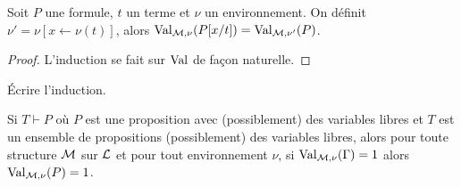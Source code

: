 \begin{lem}
    Soit $P$ une formule, $t$ un terme et $\nu$ un environnement. On définit $\nu' = \nu[x \leftarrow \nu(t)]$, alors $\mathrm{Val}_{\mathcal M,\nu}(P[x/t])=\mathrm{Val}_{\mathcal M,\nu'}(P)$.
\end{lem}

\begin{proof}
    L'induction se fait sur $\mathrm{Val}$ de façon naturelle.
\end{proof}

\begin{exo}
    \'Ecrire l'induction.
\end{exo}

\begin{lem}
    Si $T\vdash P$ où $P$ est une proposition avec (possiblement) des variables libres et $T$ est un ensemble de propositions (possiblement) des variables libres, alors pour toute structure $\mathcal M$ sur $\mathcal L$ et pour tout environnement $\nu$, si $\mathrm{Val}_{\mathcal M,\nu}(\Gamma)=1$ alors $\mathrm{Val}_{\mathcal M,\nu}(P) = 1$. 
\end{lem}

